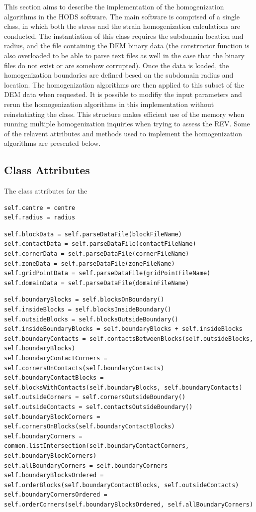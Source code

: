 This section aims to describe the implementation of the homogenization algorithms in the HODS software. The main software is comprised of a single class, in which both the stress and the strain homogenization calculations are conducted. The instantiation of this class requires the subdomain location and radius, and the file containing the DEM binary data (the constructor function is also overloaded to be able to parse text files as well in the case that the binary files do not exist or are somehow corrupted). Once the data is loaded, the homogenization boundaries are defined besed on the subdomain radius and location. The homogenization algorithms are then applied to this subset of the DEM data when requested. It is possible to modifiy the input parameters and rerun the homogenization algorithms in this implementation without reinstatiating the class. This structure makes efficient use of the memory when running multiple homogenization inquiries when trying to assess the REV. Some of the relavent attributes and methods used to implement the homogenization algorithms are presented below. 

\subsection{Class Attributes}

The class attributes for the

\begin{lstlisting}[frame=single] 
self.centre = centre
self.radius = radius
\end{lstlisting}


\begin{lstlisting}[frame=single] 
self.blockData = self.parseDataFile(blockFileName)
self.contactData = self.parseDataFile(contactFileName)
self.cornerData = self.parseDataFile(cornerFileName)
self.zoneData = self.parseDataFile(zoneFileName)
self.gridPointData = self.parseDataFile(gridPointFileName)
self.domainData = self.parseDataFile(domainFileName)
\end{lstlisting}


\begin{lstlisting}[frame=single] 
self.boundaryBlocks = self.blocksOnBoundary()
self.insideBlocks = self.blocksInsideBoundary()
self.outsideBlocks = self.blocksOutsideBoundary()
self.insideBoundaryBlocks = self.boundaryBlocks + self.insideBlocks
self.boundaryContacts = self.contactsBetweenBlocks(self.outsideBlocks, self.boundaryBlocks)
self.boundaryContactCorners = self.cornersOnContacts(self.boundaryContacts)
self.boundaryContactBlocks = self.blocksWithContacts(self.boundaryBlocks, self.boundaryContacts)
self.outsideCorners = self.cornersOutsideBoundary()
self.outsideContacts = self.contactsOutsideBoundary()
self.boundaryBlockCorners = self.cornersOnBlocks(self.boundaryContactBlocks)
self.boundaryCorners = common.listIntersection(self.boundaryContactCorners, self.boundaryBlockCorners)
self.allBoundaryCorners = self.boundaryCorners
self.boundaryBlocksOrdered = self.orderBlocks(self.boundaryContactBlocks, self.outsideContacts)
self.boundaryCornersOrdered = self.orderCorners(self.boundaryBlocksOrdered, self.allBoundaryCorners)
\end{lstlisting}

